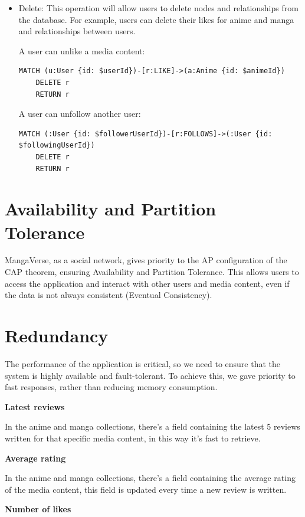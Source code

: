 \begin{itemize}
    \item Delete: This operation will allow users to delete nodes and relationships from the database. For example, users can delete their likes for anime and manga and relationships between users.
    
    A user can unlike a media content:
    \begin{lstlisting}[language=Cypher, caption=Delete Like Relationship]
    MATCH (u:User {id: $userId})-[r:LIKE]->(a:Anime {id: $animeId})
    DELETE r
    RETURN r
    \end{lstlisting}
    \newpage
    A user can unfollow another user: 
    \begin{lstlisting}[language=Cypher, caption=Delete Follow Relationship]
    MATCH (:User {id: $followerUserId})-[r:FOLLOWS]->(:User {id: $followingUserId})
    DELETE r 
    RETURN r
    \end{lstlisting}
\end{itemize}

\section {Availability and Partition Tolerance}
MangaVerse, as a social network, gives priority to the AP configuration of the CAP theorem, ensuring Availability and Partition Tolerance. This allows users to access the application and interact with other users and media content, even if the data is not always consistent (Eventual Consistency).

\section{Redundancy}
The performance of the application is critical, so we need to ensure that the system is highly available and fault-tolerant. To achieve this, we gave priority to fast responses, rather than reducing memory consumption.


\textbf{Latest reviews}


In the anime and manga collections, there's a field containing the latest 5 reviews written for that specific media content, in this way it's fast to retrieve. 


\textbf{Average rating}


In the anime and manga collections, there's a field containing the average rating of the media content, this field is updated every time a new review is written.


\textbf{Number of likes}


